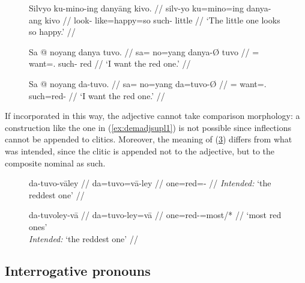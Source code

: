 \begin{figure}
\pex\label{ex:danyaadj}
\a\begingl
	\gla Silvyo ku-mino-ing danyāng kivo. //
	\glb silv-yo ku=mino=ing danya-ang kivo //
	\glc look-\TsgN{} like=happy=so such-\Aarg{} little //
	\glft `The little one looks so happy.' //
\endgl

\a\label{ex:danyatop}\begingl
	\gla Sa @ noyang danya tuvo. //
	\glb sa= no=yang danya-Ø tuvo //
	\glc \PatT{}= want=\Fsg{}.\Aarg{} such-\Top{} red //
	\glft `I want the red one.' //
\endgl
\xe
\end{figure}

\begin{figure}[h]
\ex\label{ex:redone}\begingl
	\gla Sa @ noyang da-tuvo. //
	\glb sa= no=yang da=tuvo-Ø //
	\glc \PatT{}= want=\Fsg{}.\Aarg{} such=red-\Top{} //
	\glft `I want the red one.' //
\endgl\xe
\end{figure}

If incorporated in this way, the adjective cannot take comparison morphology:
a construction like the one in (\ref{ex:demadjsupl1}) is not possible since inflections cannot be appended to
clitics.
Moreover, the meaning of (\ref{ex:demadjsupl2}) differs from what was
intended, since the  clitic is appended not to the adjective,
but to the composite nominal as such.

\begin{figure}[h]
\pex
\a\label{ex:demadjsupl1}\ljudge*\begingl
	\gla da-tuvo-vāley //
	\glb da=tuvo=vā-ley //
	\glc one=red=\Supl{}-\PargI{} //
	\glft \textit{Intended:} `the reddest one' //
\endgl

\a\label{ex:demadjsupl2}\ljudge\excl\begingl
	\gla da-tuvoley-vā //
	\glb da=tuvo-ley=vā //
	\glc one=red-\PargI{}=most/*\Supl{} //
	\glft `most red ones' \\
		\textit{Intended:} `the reddest one' //
\endgl
\xe
\end{figure}


\subsection{Interrogative pronouns}
\label{subsec:interpro}


